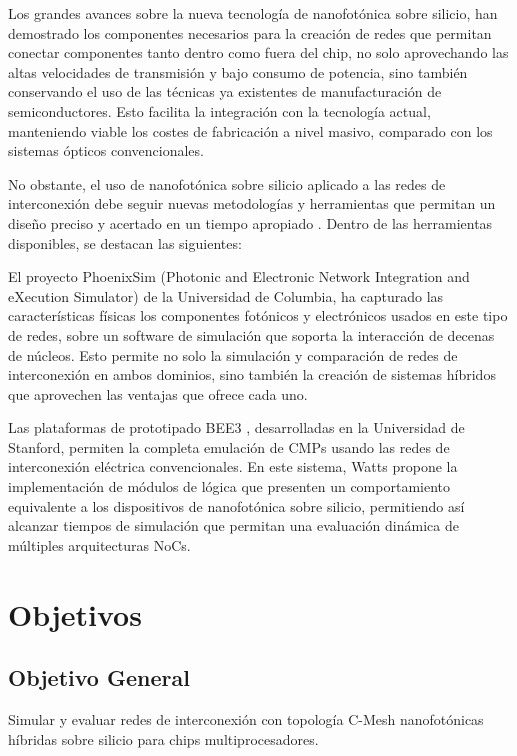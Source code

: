 Los grandes avances sobre la nueva tecnología de nanofotónica sobre silicio, han
demostrado los componentes necesarios \cite{Chan2011} para la creación de redes que permitan
conectar componentes tanto dentro como fuera del chip, no solo aprovechando las
altas velocidades de transmisión y bajo consumo de potencia, sino también
conservando el uso de las técnicas ya existentes de manufacturación de
semiconductores. Esto facilita la integración con la tecnología actual, manteniendo
viable los costes de fabricación a nivel masivo, comparado con los sistemas ópticos
convencionales.

No obstante, el uso de nanofotónica sobre silicio aplicado a las redes de interconexión
debe seguir nuevas metodologías y herramientas que permitan un diseño preciso y
acertado en un tiempo apropiado \cite{Chan2010b}. Dentro de las herramientas disponibles, se
destacan las siguientes:

El proyecto PhoenixSim \cite{Chan2010} 
(Photonic and Electronic Network Integration and eXecution
Simulator) de la Universidad de Columbia, ha capturado las características físicas los
componentes fotónicos y electrónicos usados en este tipo de redes, sobre un software
de simulación que soporta la interacción de decenas de núcleos. Esto permite no solo la
simulación y comparación de redes de interconexión en ambos dominios, sino también
la creación de sistemas híbridos que aprovechen las ventajas que ofrece cada uno.

Las plataformas de prototipado BEE3 \cite{davis2009bee3}, 
desarrolladas en la Universidad de Stanford,
permiten la completa emulación de CMPs usando las redes de interconexión eléctrica
convencionales. En este sistema, Watts \cite{watts2013} propone la implementación de módulos de
lógica que presenten un comportamiento equivalente a los dispositivos de nanofotónica
sobre silicio, permitiendo así alcanzar tiempos de simulación que permitan una
evaluación dinámica de múltiples arquitecturas NoCs.


\section{Objetivos}
\subsection{Objetivo General}
Simular y evaluar redes de interconexión con topología C-Mesh nanofotónicas híbridas 
sobre silicio para chips multiprocesadores.

